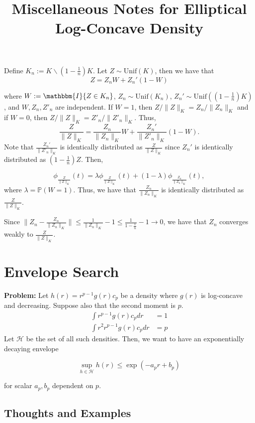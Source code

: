 \documentclass{article}
\title{Miscellaneous Notes for Elliptical Log-Concave Density}
\begin{document}
\maketitle


Define $K_n := K \backslash (1 - \frac{1}{n}) K$. Let $Z \sim \mathrm{Unif}(K)$, then we have that
\[
  Z = Z_n W + Z_n' (1 - W)
\]

where $W := \mathbbm{I}\{Z \in K_n\}$, $Z_n \sim \mathrm{Unif}(K_n)$, $Z_n' \sim \mathrm{Unif}((1 - \frac{1}{n}) K)$, and $W, Z_n, Z'_n$ are independent. If $W = 1$, then $Z/\|Z\|_K = Z_n / \| Z_n \|_K$ and if $W = 0$, then $Z/\|Z\|_K = Z'_n / \| Z'_n \|_K$. Thus,
\[
  \frac{Z}{\|Z\|_K} = \frac{Z_n}{\|Z_n\|_K} W + \frac{Z_n'}{\| Z'_n \|_K} (1 - W).
\]
Note that $\frac{Z_n'}{\| Z'_n \|_K}$ is identically distributed as $\frac{Z}{\|Z\|_K}$ since $Z_n'$ is identically distributed as $(1 - \frac{1}{n}) Z$. Then,

\[
  \phi_{\frac{Z}{\|Z\|_K}}(t) = \lambda \phi_{\frac{Z}{\|Z\|_K}}(t) + (1 - \lambda) \phi_{\frac{Z_n}{\|Z_n\|_K}}(t),
\]
where $\lambda = \mathbb{P}(W = 1)$. Thus, we have that $\frac{Z_n}{\| Z_n \|_K}$ is identically distributed as $\frac{Z}{\|Z\|_K}$.

Since $\| Z_n - \frac{Z_n}{\|Z_n\|_K} \| \leq \frac{1}{\|Z_n \|_K} - 1 \leq \frac{1}{1 - \frac{1}{n}} - 1 \rightarrow 0$, we have that $Z_n$ converges weakly to $\frac{Z}{\|Z\|_K}$. 



\section{Envelope Search}

\textbf{Problem:} Let $h(r) = r^{p-1} g(r) c_p$ be a density where $g(r)$ is log-concave and decreasing. Suppose also that the second moment is $p$. 
\begin{align*}
\int r^{p-1} g(r) c_p dr &= 1 \\
\int r^2 r^{p-1} g(r) c_p dr & = p
\end{align*}
Let $\mathcal{H}$ be the set of all such densities. Then, we want to have an exponentially decaying envelope

\[
\sup_{h \in \mathcal{H}} h(r) \leq \exp( - a_p r + b_p )
\]

for scalar $a_p, b_p$ dependent on $p$.

\subsection{Thoughts and Examples}
\end{document}
